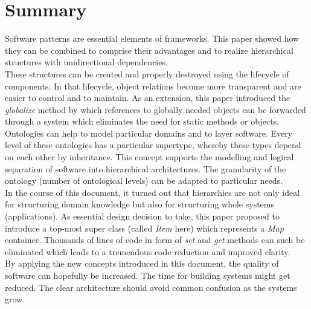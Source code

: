 %
%
%
%
%
%
%

\section{Summary}
\label{summary_heading}

Software patterns are essential elements of frameworks. This paper showed how they
can be combined to comprise their advantages and to realize hierarchical structures
with unidirectional dependencies.\\
These structures can be created and properly destroyed using the lifecycle of
components. In that lifecycle, object relations become more transparent and are
easier to control and to maintain. As an extension, this paper introduced the
\emph{globalize} method by which references to globally needed objects can be
forwarded through a system which eliminates the need for static methods or objects.\\
Ontologies can help to model particular domains and to layer software. Every level
of these ontologies has a particular supertype, whereby these types depend on each
other by inheritance. This concept supports the modelling and logical separation
of software into hierarchical architectures. The granularity of the ontology
(number of ontological levels) can be adapted to particular needs.\\
In the course of this document, it turned out that hierarchies are not only ideal
for structuring domain knowledge but also for structuring whole systems (applications).
As essential design decision to take, this paper proposed to introduce a top-most
super class (called \emph{Item} here) which represents a \emph{Map} container.
Thousands of lines of code in form of \emph{set} and \emph{get} methods can such
be eliminated which leads to a tremendous code reduction and improved clarity.\\
By applying the new concepts introduced in this document, the quality of software
can hopefully be increased. The time for building systems might get reduced.
The clear architecture should avoid common confusion as the systems grow.

